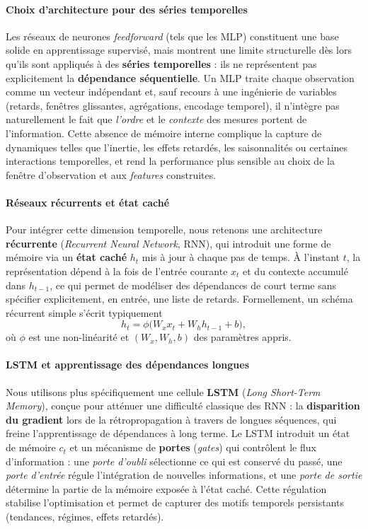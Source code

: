 \documentclass{article}
\theoremstyle{nopointbreak}
\theoremstyle{nobrkbold}
\begin{document}
\paragraph{Choix d'architecture pour des séries temporelles}
Les réseaux de neurones \emph{feedforward} (tels que les MLP) constituent une base solide en apprentissage supervisé, mais montrent une limite structurelle dès lors qu’ils sont appliqués à des \textbf{séries temporelles} : ils ne représentent pas explicitement la \textbf{dépendance séquentielle}. Un MLP traite chaque observation comme un vecteur indépendant et, sauf recours à une ingénierie de variables (retards, fenêtres glissantes, agrégations, encodage temporel), il n’intègre pas naturellement le fait que \emph{l’ordre} et le \emph{contexte} des mesures portent de l’information. Cette absence de mémoire interne complique la capture de dynamiques telles que l’inertie, les effets retardés, les saisonnalités ou certaines interactions temporelles, et rend la performance plus sensible au choix de la fenêtre d’observation et aux \emph{features} construites.

\paragraph{Réseaux récurrents et état caché}
Pour intégrer cette dimension temporelle, nous retenons une architecture \textbf{récurrente} (\emph{Recurrent Neural Network}, RNN), qui introduit une forme de mémoire via un \textbf{état caché} $h_t$ mis à jour à chaque pas de temps. À l’instant $t$, la représentation dépend à la fois de l’entrée courante $x_t$ et du contexte accumulé dans $h_{t-1}$, ce qui permet de modéliser des dépendances de court terme sans spécifier explicitement, en entrée, une liste de retards. Formellement, un schéma récurrent simple s’écrit typiquement
\[
h_t = \phi\!\big(W_x x_t + W_h h_{t-1} + b\big),
\]
où $\phi$ est une non-linéarité et $(W_x,W_h,b)$ des paramètres appris.

\paragraph{LSTM et apprentissage des dépendances longues}
Nous utilisons plus spécifiquement une cellule \textbf{LSTM} (\emph{Long Short-Term Memory}), conçue pour atténuer une difficulté classique des RNN : la \textbf{disparition du gradient} lors de la rétropropagation à travers de longues séquences, qui freine l’apprentissage de dépendances à long terme. Le LSTM introduit un état de mémoire $c_t$ et un mécanisme de \textbf{portes} (\emph{gates}) qui contrôlent le flux d’information : une \emph{porte d’oubli} sélectionne ce qui est conservé du passé, une \emph{porte d’entrée} régule l’intégration de nouvelles informations, et une \emph{porte de sortie} détermine la partie de la mémoire exposée à l’état caché. Cette régulation stabilise l’optimisation et permet de capturer des motifs temporels persistants (tendances, régimes, effets retardés).
\end{document}

